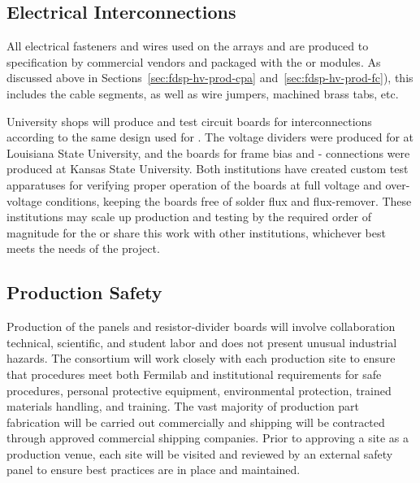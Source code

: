 \subsection{Electrical Interconnections}
\label{sec:fdsp-hv-prod-interconnect}

All electrical fasteners and wires used on the  arrays and  are produced
to specification by commercial vendors and packaged with the  or  modules.  
As discussed above in Sections~\ref{sec:fdsp-hv-prod-cpa} and~\ref{sec:fdsp-hv-prod-fc}), 
this includes the  cable segments, as well as wire jumpers, machined brass
tabs, etc.

University shops will produce and test circuit boards for %
 interconnections according to the same design used for .  The  voltage dividers were produced for  at Louisiana State University, and the boards for  frame bias and - connections were produced at Kansas State University.
Both institutions have created custom test apparatuses for verifying proper operation of the boards at full voltage and over-voltage conditions, keeping the boards free of solder flux and flux-remover.  These institutions may scale up production and testing by the required order of magnitude for the  or share this work with other institutions, whichever best meets the needs of the project. %

\subsection{Production Safety}
\label{sec:fdsp-hv-prod-safety}

Production of the  panels and resistor-divider boards will involve collaboration technical, scientific, and student labor and  does not present unusual industrial hazards. The  consortium will work closely with each production site to ensure that procedures meet both Fermilab and institutional requirements for safe procedures, personal protective equipment, environmental protection, trained materials handling, and training. The vast majority of production part fabrication will be carried out commercially and shipping will be contracted through approved commercial shipping companies. Prior to approving a site as a production venue, each site will be visited and reviewed by an external safety panel to ensure best practices are in place and maintained. 

